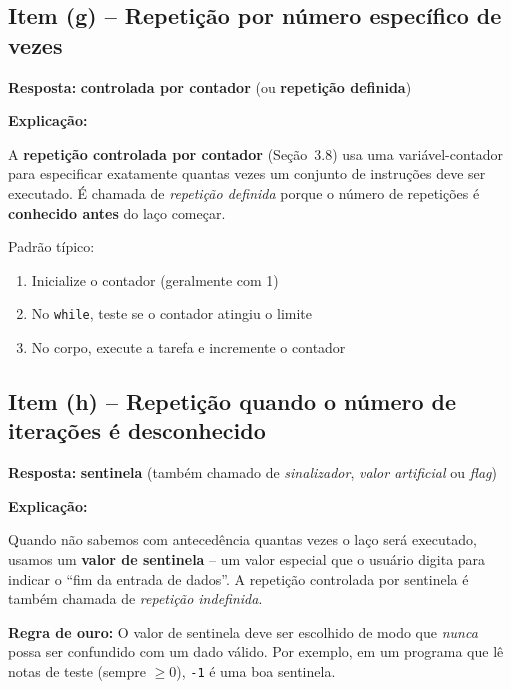 \documentclass[12pt,a4paper]{article}
\begin{document}
\subsection*{Item (g) -- Repetição por número específico de vezes}

\begin{respostabox}
\textbf{Resposta:} \textcolor{deitelblue}{\textbf{controlada por contador}} (ou \textbf{repetição definida})

\medskip\textbf{Explicação:}

A \textbf{repetição controlada por contador} (Seção~3.8) usa uma variável-contador
para especificar exatamente quantas vezes um conjunto de instruções deve ser executado.
É chamada de \textit{repetição definida} porque o número de repetições é
\textbf{conhecido antes} do laço começar.

Padrão típico:
\begin{enumerate}[noitemsep]
  \item Inicialize o contador (geralmente com 1)
  \item No \texttt{while}, teste se o contador atingiu o limite
  \item No corpo, execute a tarefa e incremente o contador
\end{enumerate}
\end{respostabox}

\subsection*{Item (h) -- Repetição quando o número de iterações é desconhecido}

\begin{respostabox}
\textbf{Resposta:} \textcolor{deitelblue}{\textbf{sentinela}} (também chamado de
\textit{sinalizador}, \textit{valor artificial} ou \textit{flag})

\medskip\textbf{Explicação:}

Quando não sabemos com antecedência quantas vezes o laço será executado, usamos um
\textbf{valor de sentinela} -- um valor especial que o usuário digita para indicar
o ``fim da entrada de dados''. A repetição controlada por sentinela é também chamada
de \textit{repetição indefinida}.

\textbf{Regra de ouro:} O valor de sentinela deve ser escolhido de modo que
\textit{nunca} possa ser confundido com um dado válido. Por exemplo, em um programa
que lê notas de teste (sempre $\geq 0$), \texttt{-1} é uma boa sentinela.
\end{respostabox}
\end{document}
